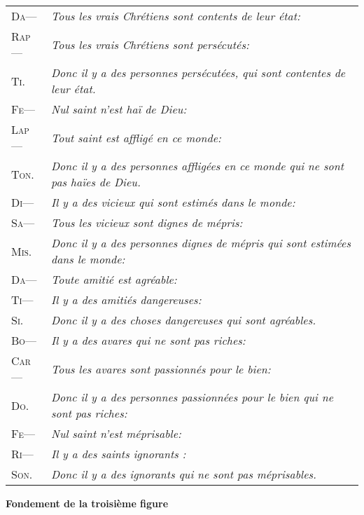 \newpage
	\begin{tabularx}{\textwidth}{lX}
		{\large\scshape Da— } & \emph{Tous les vrais Chrétiens sont contents de leur état:} \\
		{\large\scshape Rap—} & \emph{Tous les vrais Chrétiens sont persécutés:} \\
		{\large\scshape Ti. } & \emph{Donc il y a des personnes persécutées, qui sont contentes de leur état.} \\
		{\large\scshape Fe— } & \emph{Nul saint n'est haï de Dieu:} \\
		{\large\scshape Lap—} & \emph{Tout saint est affligé en ce monde:} \\
		{\large\scshape Ton.} & \emph{Donc il y a des personnes affligées en ce monde qui ne sont pas haïes de Dieu.} \\
		{\large\scshape Di— } & \emph{Il y a des vicieux qui sont estimés dans le monde:} \\
		{\large\scshape Sa— } & \emph{Tous les vicieux sont dignes de mépris:} \\
		{\large\scshape Mis.} & \emph{Donc il y a des personnes dignes de mépris qui sont estimées dans le monde:} \\
		{\large\scshape Da— } & \emph{Toute amitié est agréable:} \\
		{\large\scshape Ti— } & \emph{Il y a des amitiés dangereuses:} \\
		{\large\scshape Si. } & \emph{Donc il y a des choses dangereuses qui sont agréables.} \\
		{\large\scshape Bo— } & \emph{Il y a des avares qui ne sont pas riches:} \\
		{\large\scshape Car—} & \emph{Tous les avares sont passionnés pour le bien:} \\
		{\large\scshape Do. } & \emph{Donc il y a des personnes passionnées pour le bien qui ne sont pas riches:} \\
		{\large\scshape Fe— } & \emph{Nul saint n'est méprisable:} \\
		{\large\scshape Ri— } & \emph{Il y a des saints ignorants :} \\
		{\large\scshape Son.} & \emph{Donc il y a des ignorants qui ne sont pas méprisables.} \\
	\end{tabularx}


\begin{center}{\bfseries Fondement de la troisième figure}\end{center}

